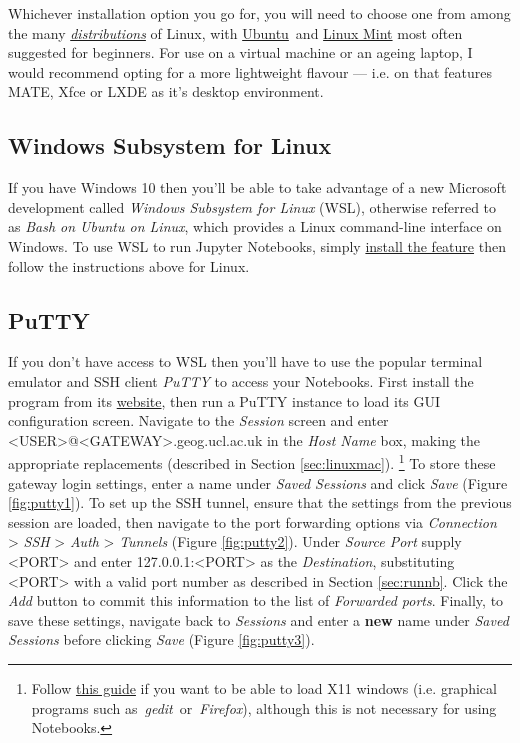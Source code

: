 \documentclass[a4paper]{article}
\begin{document}
Whichever installation option you go for, you will need to choose one from among the many \emph{\href{http://distrowatch.com/dwres.php?resource=major}{distributions}} of Linux, with \href{https://www.ubuntu.com/download}{Ubuntu}~and \href{https://linuxmint.com/}{Linux Mint} most often suggested for beginners. For use on a virtual machine or an ageing laptop, I would recommend opting for a more lightweight flavour --- i.e. on that features MATE, Xfce or LXDE as it's desktop environment.

\subsection{Windows Subsystem for Linux}
\label{sec:wsl}
If you have Windows 10 then you'll be able to take advantage of a new Microsoft development called \emph{Windows Subsystem for Linux} (WSL), otherwise referred to as \emph{Bash on Ubuntu on Linux}, which provides a Linux command-line interface on Windows.
To use WSL to run Jupyter Notebooks, simply \href{https://msdn.microsoft.com/en-gb/commandline/wsl/install_guide}{install the feature} then follow the instructions above for Linux.

\subsection{PuTTY}
\label{sec:putty}

If you don't have access to WSL then you'll have to use the popular terminal emulator and SSH client \emph{PuTTY} to access your Notebooks. 
First install the program from its \href{http://www.chiark.greenend.org.uk/~sgtatham/putty/latest.html}{website}, then run a PuTTY instance to load its GUI configuration screen. 
Navigate to the \emph{Session} screen and enter \textless{}USER\textgreater{}@\textless{}GATEWAY\textgreater{}.geog.ucl.ac.uk in the \emph{Host Name} box, making the appropriate replacements (described in Section \ref{sec:linuxmac}).
\footnote{Follow \href{http://www.geo.mtu.edu/geoschem/docs/putty_install.html}{this guide} if you want to be able to load X11 windows (i.e. graphical programs such as~\emph{gedit}~or~\emph{Firefox}), although this is not necessary for using Notebooks.}
To store these gateway login settings, enter a name under \emph{Saved Sessions} and click \emph{Save} (Figure \ref{fig:putty1}).
To set up the SSH tunnel, ensure that the settings from the previous session are loaded, then navigate to the port forwarding options via \emph{Connection} \textgreater{} \emph{SSH} \textgreater{} \emph{Auth} \textgreater{} \emph{Tunnels} (Figure \ref{fig:putty2}). 
Under \emph{Source Port} supply \textless{}PORT\textgreater{} and enter 127.0.0.1:\textless{}PORT\textgreater{} as the \emph{Destination}, substituting \textless{}PORT\textgreater{} with a valid port number as described in Section \ref{sec:runnb}.
Click the \emph{Add} button to commit this information to the list of \emph{Forwarded ports}.
Finally, to save these settings, navigate back to \emph{Sessions} and enter a \textbf{new} name under \emph{Saved Sessions} before clicking \emph{Save} (Figure \ref{fig:putty3}).
\end{document}
